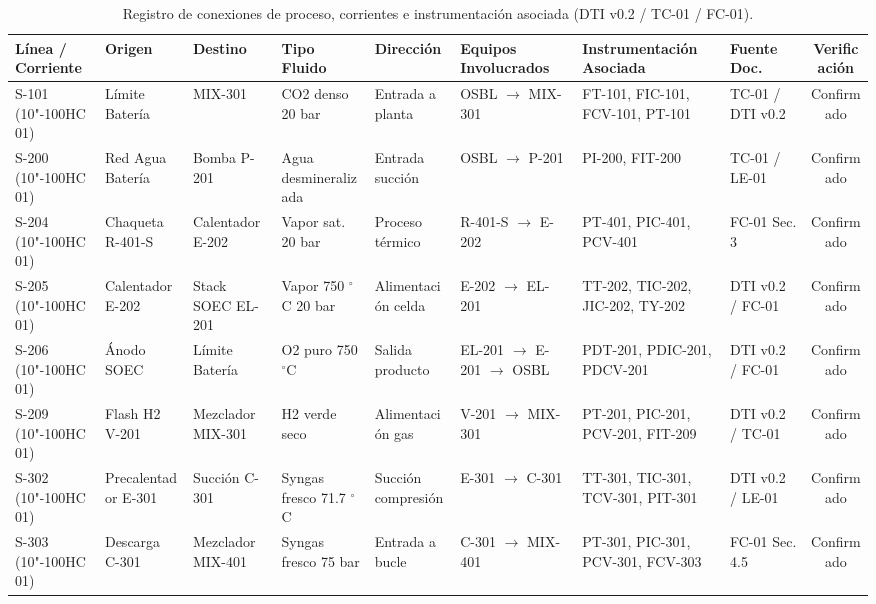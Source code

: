 \documentclass[10pt,letterpaper]{article}
\begin{document}
\begin{landscape}
\begin{table}[H]
\centering\footnotesize
\caption{Registro de conexiones de proceso, corrientes e instrumentación asociada (DTI v0.2 / TC-01 / FC-01).} \label{tab:conexiones_proceso}
\begin{tabularx}{\linewidth}{|p{2.0cm}|p{2.0cm}|p{2.0cm}|p{1.8cm}|p{1.6cm}|p{2.6cm}|p{3.2cm}|p{2.0cm}|c|}
\hline
\rowcolor{tableheader}\color{white}\textbf{Línea / Corriente} & \color{white}\textbf{Origen} & \color{white}\textbf{Destino} & \color{white}\textbf{Tipo Fluido} & \color{white}\textbf{Dirección} & \color{white}\textbf{Equipos Involucrados} & \color{white}\textbf{Instrumentación Asociada} & \color{white}\textbf{Fuente Doc.} & \color{white}\textbf{Verificación} \\ \hline
S-101 (10"-100HC01) & Límite Batería & MIX-301 & CO2 denso 20 bar & Entrada a planta & OSBL $\to$ MIX-301 & FT-101, FIC-101, FCV-101, PT-101 & TC-01 / DTI v0.2 & Confirmado \\ \hline
S-200 (10"-100HC01) & Red Agua Batería & Bomba P-201 & Agua desmineralizada & Entrada succión & OSBL $\to$ P-201 & PI-200, FIT-200 & TC-01 / LE-01 & Confirmado \\ \hline
S-204 (10"-100HC01) & Chaqueta R-401-S & Calentador E-202 & Vapor sat. 20 bar & Proceso térmico & R-401-S $\to$ E-202 & PT-401, PIC-401, PCV-401 & FC-01 Sec. 3 & Confirmado \\ \hline
S-205 (10"-100HC01) & Calentador E-202 & Stack SOEC EL-201 & Vapor 750 $^\circ$C 20 bar & Alimentación celda & E-202 $\to$ EL-201 & TT-202, TIC-202, JIC-202, TY-202 & DTI v0.2 / FC-01 & Confirmado \\ \hline
S-206 (10"-100HC01) & Ánodo SOEC & Límite Batería & O2 puro 750 $^\circ$C & Salida producto & EL-201 $\to$ E-201 $\to$ OSBL & PDT-201, PDIC-201, PDCV-201 & DTI v0.2 / FC-01 & Confirmado \\ \hline
S-209 (10"-100HC01) & Flash H2 V-201 & Mezclador MIX-301 & H2 verde seco & Alimentación gas & V-201 $\to$ MIX-301 & PT-201, PIC-201, PCV-201, FIT-209 & DTI v0.2 / TC-01 & Confirmado \\ \hline
S-302 (10"-100HC01) & Precalentador E-301 & Succión C-301 & Syngas fresco 71.7 $^\circ$C & Succión compresión & E-301 $\to$ C-301 & TT-301, TIC-301, TCV-301, PIT-301 & DTI v0.2 / LE-01 & Confirmado \\ \hline
S-303 (10"-100HC01) & Descarga C-301 & Mezclador MIX-401 & Syngas fresco 75 bar & Entrada a bucle & C-301 $\to$ MIX-401 & PT-301, PIC-301, PCV-301, FCV-303 & FC-01 Sec. 4.5 & Confirmado \\ \hline

\end{tabularx}
\end{table}
\end{landscape}
\end{document}
